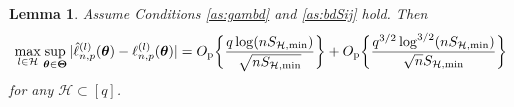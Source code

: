 \documentclass[12pt]{article}
\newtheorem{lemma}{Lemma}
\newcommand{\bTheta}{\boldsymbol \Theta}
\newcommand{\btheta}{\boldsymbol \theta}
\newcommand{\btc}{{\rm c}}
\newcommand{\0}{{\bf 0}}
\begin{document}
\begin{lemma}\label{la:uniformcov}
 Assume Conditions {\rm\ref{as:gambd}} and {\rm\ref{as:bdSij}} hold. Then  
\begin{align*}
\max_{l\in\mathcal{H}}\sup_{\btheta \in \bTheta}|\hat{\ell}_{n,p}^{(l)}(\btheta) - \ell_{n,p}^{(l)}(\btheta)|=O_{\rm p}\bigg\{\frac{q\log(nS_{\mathcal{H},\min})}{\sqrt{nS_{\mathcal{H},\min}}}\bigg\}+O_{\rm p}\bigg\{\frac{q^{3/2}\log^{3/2}(nS_{\mathcal{H},\min})}{\sqrt{n}S_{\mathcal{H},\min}}\bigg\}
\end{align*}
for any $\mathcal{H}\subset[q]$.
\end{lemma}

\end{document}
